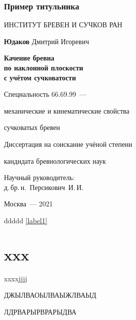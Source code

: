 \documentclass [a4paper,oneside,final,14pt]{extarticle}
\begin{document}
\subsection{Пример титульника}
\clearpage
\thispagestyle{empty}
\centerline{ИНСТИТУТ БРЕВЕН И СУЧКОВ РАН}
\centerline{\hfill\hrulefill\hrulefill\hfill}
\vfill
{}
\vfill
\vfill
\large
\centerline{{\bf Юдаков} Дмитрий Игоревич}
\vfill
\Large
\begin{centering}
	{\bf Качение бревна\\ по наклонной плоскости\\
	с учётом сучковатости\\}
\end{centering}
\normalsize
\vfill
\centerline{Специальность 66.69.99~--- }
\centerline{механические и кинематические свойства}
\centerline{сучковатых бревен}
\vfill
\centerline{Диссертация на соискание учёной степени}
\centerline{кандидата бревнологических наук}
\vfill
\vfill
\begin{flushright}
Научный руководитель:\\
д.\,бр.\,н.~Персикович~И.\,И.
\end{flushright}
\vfill
\vfill
\centerline{Москва~--- 2021}

\tableofcontents


ddddd \ref{label1}

\appendix


\chapter{xxx}

xxxxjjjj

\renewcommand\bibname{Cписок литературы}
\begin{thebibliography}{00}

	 ДЖЫЛВАОЫЛВАЫЖЛВАЫД
	
	 ЛДРВАРЫРВРАРЫДВА 
	
\end{thebibliography}
\end{document}
